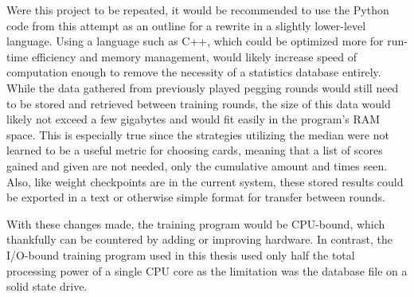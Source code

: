 Were this project to be repeated,
it would be recommended to use the Python code from this attempt as an outline
for a rewrite in a slightly lower-level language.
%
Using a language such as C++,
which could be optimized more for run-time efficiency and memory management,
would likely increase speed of computation enough to remove the necessity
of a statistics database entirely.
%
While the data gathered from previously played pegging rounds would still need
to be stored and retrieved between training rounds,
the size of this data would likely not exceed a few gigabytes and would fit
easily in the program's RAM space.
%
This is especially true since the strategies utilizing the median were not
learned to be a useful metric for choosing cards,
meaning that a list of scores gained and given are not needed,
only the cumulative amount and times seen.
%
Also,
like weight checkpoints are in the current system,
these stored results could be exported in a text or otherwise simple format
for transfer between rounds.

With these changes made,
the training program would be CPU-bound,
which thankfully can be countered by adding or improving hardware.
%
In contrast,
the I/O-bound training program used in this thesis used only half the total
processing power of a single CPU core
as the limitation was the database file on a solid state drive.

